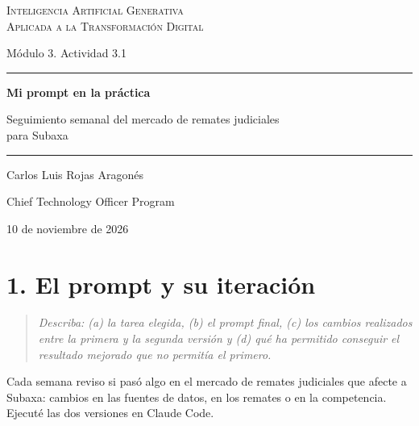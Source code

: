 \documentclass[11pt,letterpaper]{article}
\newcommand{\pregunta}[1]{%
  \begin{quote}\color{cGris}\small\itshape #1\end{quote}}
\begin{document}
\begin{titlepage}
\centering
\vspace*{3.2cm}
{\large\scshape Inteligencia Artificial Generativa\\
Aplicada a la Transformación Digital\par}
\vspace{0.5cm}
{\normalsize Módulo 3. Actividad 3.1\par}
\vspace{2.6cm}
{\color{cEje}\rule{0.55\textwidth}{0.8pt}\par}
\vspace{0.7cm}
{\LARGE\bfseries Mi prompt en la práctica\par}
\vspace{0.5cm}
{\large Seguimiento semanal del mercado de remates judiciales\\
para Subaxa\par}
\vspace{0.7cm}
{\color{cEje}\rule{0.55\textwidth}{0.8pt}\par}
\vfill
{\large Carlos Luis Rojas Aragonés\par}
\vspace{0.3cm}
{\normalsize Chief Technology Officer Program\par}
\vspace{0.3cm}
{\normalsize 10 de noviembre de 2026\par}
\vspace*{1.5cm}
\end{titlepage}

\section*{1. El prompt y su iteración}

\pregunta{Describa: (a) la tarea elegida, (b) el prompt final, (c) los
cambios realizados entre la primera y la segunda versión y (d) qué ha
permitido conseguir el resultado mejorado que no permitía el primero.}

Cada semana reviso si pasó algo en el mercado de remates judiciales que
afecte a Subaxa: cambios en las fuentes de datos, en los remates o en la
competencia. Ejecuté las dos versiones en Claude Code.
\end{document}
